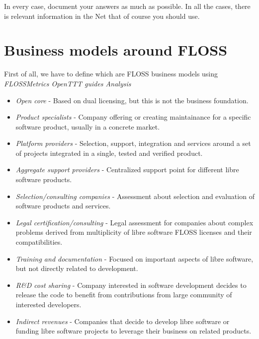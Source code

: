 \documentclass[11pt]{scrartcl}
\begin{document}
\par In every case, document your answers as much as possible. In all the cases, there is relevant information in the Net that of course you should use.

\section{Business models around FLOSS}

\par First of all, we have to define which are FLOSS business models using \emph{FLOSSMetrics OpenTTT guides Analysis}\cite{floss-bm}

\begin{itemize}
	\item \emph{Open core} - Based on dual licensing, but this is not the business foundation. 

	\item \emph{Product specialists} - Company offering or creating maintainance for a specific software product, usually in a concrete market.

	\item \emph{Platform providers} - Selection, support, integration and services around a set of projects integrated in a single, tested and verified product.

	\item \emph{Aggregate support providers} - Centralized support point for different libre software products.

	\item \emph{Selection/consulting companies} - Assessment about selection and evaluation of software products and services.

	\item \emph{Legal certification/consulting} - Legal assessment for companies about complex problems derived from multiplicity of libre software FLOSS licenses and their compatibilities.

	\item \emph{Training and documentation} - Focused on important aspects of libre software, but not directly related to development.

	\item \emph{R\&D cost sharing} - Company interested in software development decides to release the code to benefit from contributions from large community of interested developers.

	\item \emph{Indirect revenues} - Companies that decide to develop libre software or funding libre software projects to leverage their business on related products.

\end{itemize}
\end{document}
